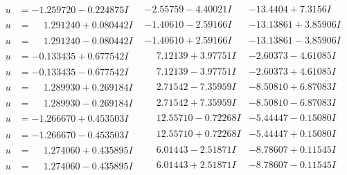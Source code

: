 \documentclass[1p]{elsarticle_modified}
\theoremstyle{definition}
\begin{document}
$$\begin{array}{c|c|c}
\begin{aligned}
u &= -1.259720 - 0.224875 I\end{aligned}
 & -2.55759 - 4.40021 I & -13.4404 + 7.3156 I \\ \hline\begin{aligned}
u &= \phantom{-}1.291240 + 0.080442 I\end{aligned}
 & -1.40610 - 2.59166 I & -13.13861 + 3.85906 I \\ \hline\begin{aligned}
u &= \phantom{-}1.291240 - 0.080442 I\end{aligned}
 & -1.40610 + 2.59166 I & -13.13861 - 3.85906 I \\ \hline\begin{aligned}
u &= -0.133435 + 0.677542 I\end{aligned}
 & \phantom{-}7.12139 + 3.97751 I & -2.60373 - 4.61085 I \\ \hline\begin{aligned}
u &= -0.133435 - 0.677542 I\end{aligned}
 & \phantom{-}7.12139 - 3.97751 I & -2.60373 + 4.61085 I \\ \hline\begin{aligned}
u &= \phantom{-}1.289930 + 0.269184 I\end{aligned}
 & \phantom{-}2.71542 - 7.35959 I & -8.50810 + 6.87083 I \\ \hline\begin{aligned}
u &= \phantom{-}1.289930 - 0.269184 I\end{aligned}
 & \phantom{-}2.71542 + 7.35959 I & -8.50810 - 6.87083 I \\ \hline\begin{aligned}
u &= -1.266670 + 0.453503 I\end{aligned}
 & \phantom{-}12.55710 - 0.72268 I & -5.44447 - 0.15080 I \\ \hline\begin{aligned}
u &= -1.266670 - 0.453503 I\end{aligned}
 & \phantom{-}12.55710 + 0.72268 I & -5.44447 + 0.15080 I \\ \hline\begin{aligned}
u &= \phantom{-}1.274060 + 0.435895 I\end{aligned}
 & \phantom{-}6.01443 - 2.51871 I & -8.78607 + 0.11545 I \\ \hline\begin{aligned}
u &= \phantom{-}1.274060 - 0.435895 I\end{aligned}
 & \phantom{-}6.01443 + 2.51871 I & -8.78607 - 0.11545 I \\ \hline\begin{aligned}

\end{aligned}
\end{array}$$
\end{document}

